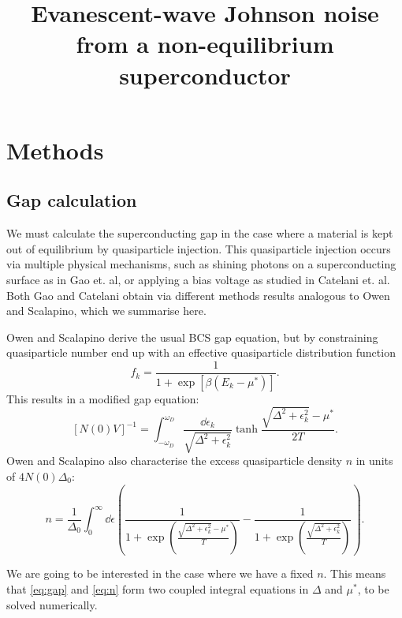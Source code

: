 \documentclass{article}
\title{Evanescent-wave Johnson noise from a non-equilibrium superconductor}
\newcommand{\corr}{\mu^{\ast}}
\begin{document}
\maketitle

\section{Methods \label{sec:methods}}

\subsection{Gap calculation \label{subsec:gapcalc}}

We must calculate the superconducting gap in the case where a material is kept out of equilibrium by quasiparticle injection.
This quasiparticle injection occurs via multiple physical mechanisms, such as shining photons on a superconducting surface as in Gao et. al\cite{Gao2008}, or applying a bias voltage as studied in Catelani et. al\cite{Catelani2010}.
Both Gao and Catelani obtain via different methods results analogous to Owen and Scalapino\cite{OwenScalapino}, which we summarise here.

Owen and Scalapino derive the usual BCS gap equation, but by constraining quasiparticle number end up with an effective quasiparticle distribution function
\begin{equation}
	f_k = \frac{1}{1 + \exp[\beta \left(E_k - \corr \right)]}.
\end{equation}
This results in a modified gap equation:
\begin{equation}
	\left[ N(0) V \right]^{-1} = \int_{- \omega_D}^{\omega_D} \frac{\dd{\epsilon_k}}{\sqrt{\Delta^2 + \epsilon_k^2}} \tanh{\frac{\sqrt{\Delta^2 + \epsilon_k^2} - \corr}{2 T}}. \label{eq:gap}
\end{equation}
Owen and Scalapino also characterise the excess quasiparticle density $n$ in units of $4 N(0) \Delta_0$:
\begin{equation}
	n = \frac{1}{\Delta_0} \int_0^\infty \dd{\epsilon} \left( \frac{1}{1 + \exp(\frac{\sqrt{\Delta^2 + \epsilon_k^2} - \corr}{T})} - \frac{1}{1 + \exp(\frac{\sqrt{\Delta^2 + \epsilon_k^2}}{T})} \right). \label{eq:n}
\end{equation}

We are going to be interested in the case where we have a fixed $n$. 
This means that \eqref{eq:gap} and \eqref{eq:n} form two coupled integral equations in $\Delta$ and $\corr$, to be solved numerically.
\end{document}
